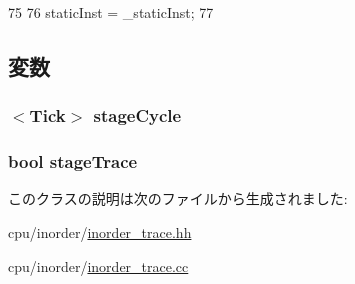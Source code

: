 \begin{DoxyCode}
75     {
76         staticInst = _staticInst;
77     }
\end{DoxyCode}


\subsection{変数}
\hypertarget{classTrace_1_1InOrderTraceRecord_aa23c42c06ba21de41c22e82e1d63428d}{
\subsubsection[{stageCycle}]{$<${\bf Tick}$>$ {\bf stageCycle}}}
\label{classTrace_1_1InOrderTraceRecord_aa23c42c06ba21de41c22e82e1d63428d}
\hypertarget{classTrace_1_1InOrderTraceRecord_a5552f190a6178891b46e275d9a2f4718}{
\subsubsection[{stageTrace}]{\setlength{\rightskip}{0pt plus 5cm}bool {\bf stageTrace}}}
\label{classTrace_1_1InOrderTraceRecord_a5552f190a6178891b46e275d9a2f4718}


このクラスの説明は次のファイルから生成されました:\begin{DoxyCompactItemize}
\item 
cpu/inorder/\hyperlink{inorder__trace_8hh}{inorder\_\-trace.hh}\item 
cpu/inorder/\hyperlink{inorder__trace_8cc}{inorder\_\-trace.cc}\end{DoxyCompactItemize}
